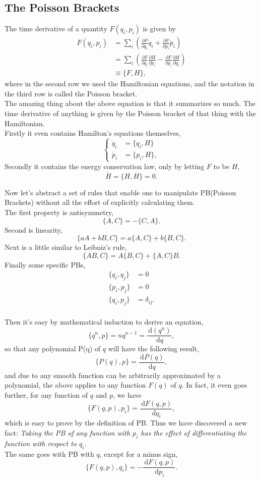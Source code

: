 \documentclass{article}
\newcommand{\be}{\begin{equation}}
\newcommand{\ee}{\end{equation}}
\newcommand{\bs}{\be\begin{split}}
\newcommand{\dif}{\,\mathrm{d}}
\newcommand{\p}{\partial}
\newcommand{\1}{\left}
\newcommand{\2}{\right}
\newcommand{\del}{\delta}
\begin{document}
\subsection{The Poisson Brackets}
The time derivative of a quantity $F(q_i, p_i)$ is given by
\bs
\dot F(q_i, p_i)&=\sum_i \1(\frac{\p F}{\p q_i} \dot q_i+\frac{\p F}{\p p_i} \dot p_i\2)\\
&=\sum_i \1(\frac{\p F}{\p q_i} \frac{\p H}{\p p_i}-\frac{\p F}{\p p_i} \frac{\p H}{\p q_i}\2)\\
&\equiv \{F,H\},
\end{split}\ee
where in the second row we used the Hamiltonian equations, and the notation in the third row is called the Poisson bracket.\\

The amazing thing about the above equation is that it summarizes so much. The time derivative of anything is given by the Poisson bracket of that thing with the Hamiltonian.\\
Firstly it even contains Hamilton's equations themselves,
\be\1\{\begin{split}
\dot q_i&=\{q_i,H\}\\
\dot p_i&=\{p_i,H\},
\end{split}\2.\ee
Secondly it contains the energy conservation law, only by letting $F$ to be $H$,
\be
\dot H=\{H,H\}=0.
\ee

Now let's abstract a set of rules that enable one to manipulate PB(Poisson Brackets) without all the effort of explicitly calculating them.\\
The first property is antisymmetry,
\be
\{A,C\}=-\{C,A\}.
\ee
Second is linearity,
\be
\{aA+bB,C\}=a\{A,C\}+b\{B,C\}.
\ee
Next is a little similar to Leibniz's rule,
\be
\{AB,C\}=A\{B,C\}+\{A,C\}B.
\ee
Finally some specific PBs,
\bs
\{q_i,q_j\}&=0\\
\{p_i,p_j\}&=0\\
\{q_i,p_j\}&=\del_{ij}.
\end{split}\ee\\

Then it's easy by mathematical induction to derive an equation,
\be
\{q^n,p\}=nq^{n-1}=\frac{\dif (q^n)}{\dif q},
\ee
so that any polynomial P(q) of $q$ will have the following result,
\be
\{P(q),p\}=\frac{\dif P(q)}{\dif q},
\ee
and due to any smooth function can be arbitrarily approximated by a polynomial, the above applies to any function $F(q)$ of $q$. In fact, it even goes further, for any function of $q$ and $p$, we have
\be
\{F(q,p),p_i\}=\frac{\dif F(q,p)}{\dif q_i},
\ee
which is easy to prove by the definition of PB. Thus we have discovered a new fact: \textit{Taking the PB of any function with $p_i$ has the effect of differentiating the function with respect to $q_i$.}\\
The same goes with PB with $q$, except for a minus sign,
\be
\{F(q,p),q_i\}=-\frac{\dif F(q,p)}{\dif p_i}.
\ee
\end{document}
